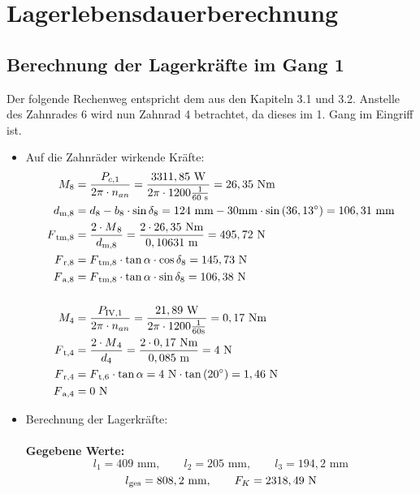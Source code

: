 \newpage
\chapter{Lagerlebensdauerberechnung}
\section{Berechnung der Lagerkräfte im Gang 1}
Der folgende Rechenweg entspricht dem aus den Kapiteln 3.1 und 3.2. Anstelle des Zahnrades 6 wird nun Zahnrad 4 betrachtet, da dieses im 1. Gang im Eingriff ist.
\begin{itemize}
	\item Auf die Zahnräder wirkende Kräfte:
	\begin{align*}
	M_8 &= \frac{P_{c,1}}{2\pi \cdot n_{an}} = \frac{3311,85 \text { W}}{2\pi \cdot 1200 \frac{1}{60 \text{ s}}}= 26,35 \text{ Nm}\\
	d\textsubscript{m,8} &= d_8 - b_8 \cdot \sin{\delta_8} = 124 \text{ mm} - 30\text{mm} \cdot \sin{(36,13^\circ)} = 106,31 \text{ mm}\\ 
	F\textsubscript{tm,8} &= \frac{2 \cdot M\textsubscript{8}}{d\textsubscript{m,8}} = \frac{2 \cdot 26,35 \text{ Nm} } {0,10631 \text{ m}} = 495,72 \text{ N}\\
	F\textsubscript{r,8} &= F\textsubscript{tm,8} \cdot \tan{\alpha} \cdot \cos{\delta_8} = 145,73 \text{ N}\\ 
	F\textsubscript{a,8} &= F\textsubscript{tm,8}\cdot \tan{\alpha} \cdot \sin{\delta_8} = 106,38 \text{ N} \\ \\
	M_4 &= \frac{P_{\mathrm{IV},1}}{2 \pi \cdot n_{an}} = \frac{21,89 \text{ W}}{2 \pi \cdot 1200 \frac{1}{60 \text{s}}} = 0,17 \text{ Nm}\\
	F\textsubscript{t,4} &= \frac{2\cdot M\textsubscript{4}}{d_4} = \frac{2 \cdot 0,17 \text{ Nm}}{0,085 \text{ m}} = 4 \text{ N}\\ 
	F\textsubscript{r,4} &= F\textsubscript{t,6} \cdot \tan{\alpha} =4 \text{ N} \cdot \tan{(20^\circ)} = 1,46 \text{ N}\\ 
	F\textsubscript{a,4} &= 0\text{ N}\\
	\end{align*}
	\newpage
	\item Berechnung der Lagerkräfte: \\ \\
	\textbf{Gegebene Werte:}
	\[l_1 = 409\text{ mm} , \qquad l_2 = 205\text{ mm}, \qquad l_3 =194,2\text{ mm} \]
	\[ l\textsubscript{ges}= 808,2\text{ mm} , \qquad F_K=2318,49 \text{ N} \]

\end{itemize}
